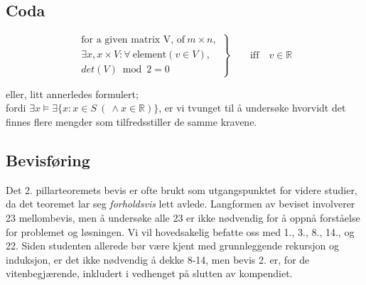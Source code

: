\subsection{Coda}

\begin{displaymath}
\left.\begin{aligned}
\text{for a given matrix V, of}~ m \times n, \\
\exists x, x \times V : \forall ~\text{element}(v \in V), \\
det(V) \bmod{2} = 0
\end{aligned}\right\} \qquad\text{iff} \quad v \in \mathbb{R}
\end{displaymath}
\vspace{2em}

eller, litt annerledes formulert;\\
fordi $ \exists x \models \exists \{ x : x \in S~(~\land x \in \mathbb{R} ) \} $, er vi tvunget til å undersøke hvorvidt det finnes flere mengder som tilfredsstiller de samme kravene.

\subsection{Bevisføring}
Det 2. pillarteoremets bevis er ofte brukt som utgangspunktet for videre studier, da det teoremet lar seg \emph{forholdsvis} lett avlede. Langformen av beviset involverer 23 mellombevis, men å undersøke alle 23 er ikke nødvendig for å oppnå forståelse for problemet og løsningen. Vi vil hovedsakelig befatte oss med 1., 3., 8., 14., og 22. Siden studenten allerede bør være kjent med grunnleggende rekursjon og induksjon, er det ikke nødvendig å dekke 8-14, men bevis 2. er, for de vitenbegjærende, inkludert i vedhenget på slutten av kompendiet.
